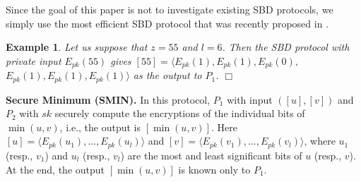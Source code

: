 \documentclass{article}
\newtheorem{example}{Example}
\begin{document}
Since the goal of this paper is not to investigate existing SBD protocols, we simply 
use the most efficient SBD protocol that was recently proposed in \cite{bksam-asiaccs13}.

\begin{example} Let us suppose that $z=55$ and $l=6$. Then the SBD protocol with private input $E_{pk}(55)$ gives 
$[55] = \langle E_{pk}(1), E_{pk}(1), E_{pk}(0),$ $E_{pk}(1), E_{pk}(1), E_{pk}(1)\rangle$ as the output to $P_1$.
\hfill $\Box$\\
\end{example} 
\noindent \textbf{Secure Minimum (SMIN). }
In this protocol, $P_1$ with 
input $([u], [v])$ and $P_2$ with $sk$ securely compute 
the encryptions of the individual bits of $\min(u, v)$, i.e., 
the output is $[\min(u, v)]$. Here $[u] = \langle E_{pk}(u_1), \ldots, E_{pk}(u_l) \rangle$ 
and $[v] = \langle E_{pk}(v_1), \ldots, E_{pk}(v_l) \rangle$, where $u_1$ (resp., $v_1$) and 
$u_l$ (resp., $v_l$) are the most and least significant bits of $u$ (resp., $v$). At 
the end, the output $[\min(u, v)]$ is known only to $P_1$. 
\end{document}
